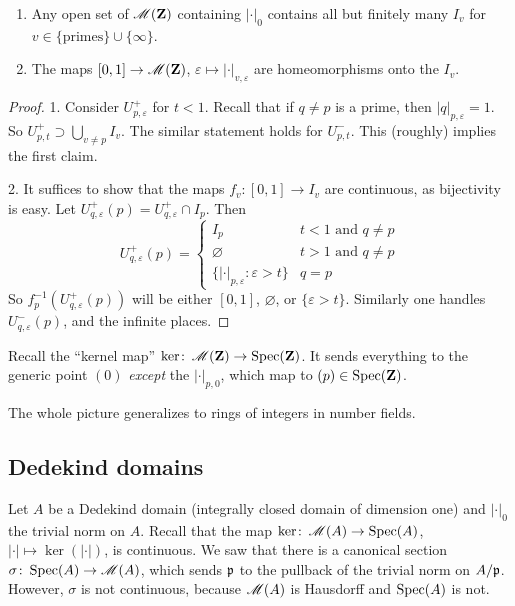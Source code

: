 \begin{proposition}
\leavevmode
\begin{enumerate}
\item
Any open set of $\operatorname{\mathscr{M}}(\mathbf{Z})$ containing $|\cdot|_0$ contains all but 
finitely many $I_v$ for $v\in \{\text{primes}\}\cup\{\infty\}$. 

\item
The maps $[0,1]\to \operatorname{\mathscr{M}}(\mathbf{Z})$, $\varepsilon\mapsto |\cdot|_{v,\varepsilon}$ 
are homeomorphisms onto the $I_v$. 
\end{enumerate}
\end{proposition}
\begin{proof}
1. Consider $U_{p,\varepsilon}^+$ for $t<1$. Recall that if $q\ne p$ is a prime, 
then $|q|_{p,\varepsilon}=1$. So $U_{p,t}^+\supset \bigcup_{v\ne p} I_v$. The 
similar statement holds for $U_{p,t}^-$. This (roughly) implies the first 
claim. 

2. It suffices to show that the maps $f_v\colon [0,1]\to I_v$ are continuous, as 
bijectivity is easy. Let $U_{q,\varepsilon}^+(p)=U_{q,\varepsilon}^+\cap I_p$. 
Then 
\[
  U_{q,\varepsilon}^+(p) = \begin{cases} I_p & t<1\text{ and }q\ne p \\ \varnothing & t>1\text{ and }q\ne p \\ \{|\cdot|_{p,\varepsilon}\colon \varepsilon>t\} & q=p \end{cases}
\]
So $f_p^{-1}(U_{q,\varepsilon}^+(p))$ will be either $[0,1]$, $\varnothing$, or 
$\{\varepsilon>t\}$. Similarly one handles $U_{q,\varepsilon}^-(p)$, and the 
infinite places. 
\end{proof}

Recall the ``kernel map'' $\ker\colon \operatorname{\mathscr{M}}(\mathbf{Z})\to \operatorname{Spec}(\mathbf{Z})$. It sends 
everything to the generic point $(0)$ \emph{except} the $|\cdot|_{p,0}$, which 
map to $(p)\in \operatorname{Spec}(\mathbf{Z})$. 

The whole picture generalizes to rings of integers in number fields. 





\subsection{Dedekind domains}

Let $A$ be a Dedekind domain (integrally closed domain of dimension one) and 
$|\cdot|_0$ the trivial norm on $A$. Recall that the map 
$\ker\colon \operatorname{\mathscr{M}}(A)\to \operatorname{Spec}(A)$, $|\cdot|\mapsto \ker(|\cdot|)$, is 
continuous. We saw that there is a canonical section 
$\sigma\colon \operatorname{Spec}(A)\to \operatorname{\mathscr{M}}(A)$, which sends $\mathfrak{p}$ to the pullback of 
the trivial norm on $A/\mathfrak{p}$. However, $\sigma$ is not continuous, because 
$\operatorname{\mathscr{M}}(A)$ is Hausdorff and $\operatorname{Spec}(A)$ is not. 





